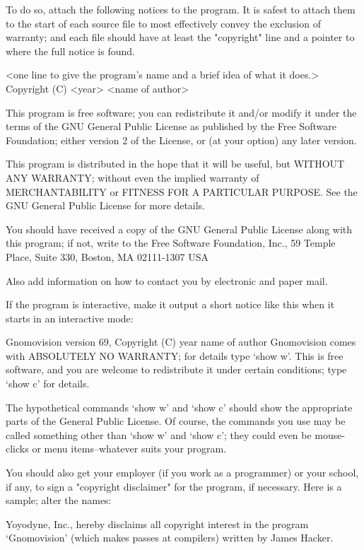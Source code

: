 \documentclass{doc}
\begin{document}
  To do so, attach the following notices to the program.  It is safest
to attach them to the start of each source file to most effectively
convey the exclusion of warranty; and each file should have at least
the "copyright" line and a pointer to where the full notice is found.

    <one line to give the program's name and a brief idea of what it does.>
    Copyright (C) <year>  <name of author>

    This program is free software; you can redistribute it and/or modify
    it under the terms of the GNU General Public License as published by
    the Free Software Foundation; either version 2 of the License, or
    (at your option) any later version.

    This program is distributed in the hope that it will be useful,
    but WITHOUT ANY WARRANTY; without even the implied warranty of
    MERCHANTABILITY or FITNESS FOR A PARTICULAR PURPOSE.  See the
    GNU General Public License for more details.

    You should have received a copy of the GNU General Public License
    along with this program; if not, write to the Free Software
    Foundation, Inc., 59 Temple Place, Suite 330, Boston, MA  02111-1307  USA


Also add information on how to contact you by electronic and paper mail.

If the program is interactive, make it output a short notice like this
when it starts in an interactive mode:

    Gnomovision version 69, Copyright (C) year name of author
    Gnomovision comes with ABSOLUTELY NO WARRANTY; for details type `show w'.
    This is free software, and you are welcome to redistribute it
    under certain conditions; type `show c' for details.

The hypothetical commands `show w' and `show c' should show the appropriate
parts of the General Public License.  Of course, the commands you use may
be called something other than `show w' and `show c'; they could even be
mouse-clicks or menu items--whatever suits your program.

You should also get your employer (if you work as a programmer) or your
school, if any, to sign a "copyright disclaimer" for the program, if
necessary.  Here is a sample; alter the names:

  Yoyodyne, Inc., hereby disclaims all copyright interest in the program
  `Gnomovision' (which makes passes at compilers) written by James Hacker.
\end{document}
